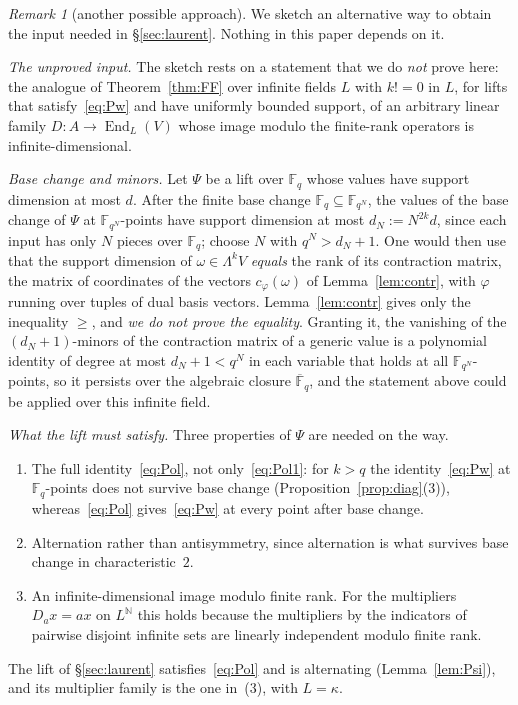 \documentclass[11pt]{amsart}
\theoremstyle{definition}
\theoremstyle{remark}
\newtheorem{remark}[theorem]{Remark}
\numberwithin{equation}{section}
\newcommand{\N}{\mathbb{N}}
\newcommand{\F}{\mathbb{F}}
\newcommand{\End}{\operatorname{End}}
\begin{document}
\begin{remark}[another possible approach]\label{rem:routeII}
We sketch an alternative way to obtain the input needed in \S\ref{sec:laurent}. Nothing in this paper depends on it.

\emph{The unproved input.} The sketch rests on a statement that we do \emph{not} prove here: the analogue of
Theorem~\ref{thm:FF} over infinite fields $L$ with $k!=0$ in $L$, for lifts that satisfy~\eqref{eq:Pw} and have
uniformly bounded support, of an arbitrary linear family $D\colon A\to\End_L(V)$ whose image modulo the finite-rank
operators is infinite-dimensional.

\emph{Base change and minors.} Let $\Psi$ be a lift over $\F_q$ whose values have support dimension at most $d$.
After the finite base change $\F_q\subseteq\F_{q^N}$, the values of the base change of $\Psi$ at $\F_{q^N}$\nobreakdash-points
have support dimension at most $d_N:=N^{2k}d$, since each input has only $N$ pieces over $\F_q$; choose $N$ with
$q^N>d_N+1$. One would then use that the support dimension of $\omega\in\Lambda^kV$ \emph{equals} the rank of its
contraction matrix, the matrix of coordinates of the vectors $c_\varphi(\omega)$ of Lemma~\ref{lem:contr}, with
$\varphi$ running over tuples of dual basis vectors. Lemma~\ref{lem:contr} gives only the inequality $\ge$, and
\emph{we do not prove the equality}. Granting it, the vanishing of the $(d_N+1)$\nobreakdash-minors of the contraction matrix of a
generic value is a polynomial identity of degree at most $d_N+1<q^N$ in each variable that holds at all
$\F_{q^N}$\nobreakdash-points, so it persists over the algebraic closure $\overline{\F}_q$, and the statement above could be
applied over this infinite field.

\emph{What the lift must satisfy.} Three properties of $\Psi$ are needed on the way.
\begin{enumerate}
\item The full identity~\eqref{eq:Pol}, not only~\eqref{eq:Pol1}: for $k>q$ the identity~\eqref{eq:Pw} at
$\F_q$\nobreakdash-points does not survive base change (Proposition~\ref{prop:diag}(3)), whereas~\eqref{eq:Pol}
gives~\eqref{eq:Pw} at every point after base change.
\item Alternation rather than antisymmetry, since alternation is what survives base change in characteristic~$2$.
\item An infinite-dimensional image modulo finite rank. For the multipliers $D_ax=ax$ on $L^\N$ this holds because
the multipliers by the indicators of pairwise disjoint infinite sets are linearly independent modulo finite rank.
\end{enumerate}
The lift of \S\ref{sec:laurent} satisfies~\eqref{eq:Pol} and is alternating (Lemma~\ref{lem:Psi}), and its multiplier
family is the one in~(3), with $L=\kappa$.
\end{remark}
\end{document}
